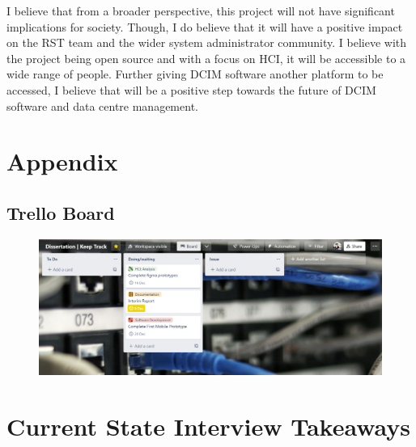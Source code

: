 \documentclass [11pt,a4paper]{article}
\begin{document}
I believe that from a broader perspective, this project will not have significant implications for society. Though, I do believe that it will have a positive impact on the RST team and the wider system administrator community. I believe with the project being open source and with a focus on HCI, it will be accessible to a wide range of people. Further giving DCIM software another platform to be accessed, I believe that will be a positive step towards the future of DCIM software and data centre management.
\pagebreak


 


\pagebreak
{}
\appendix
\section{Appendix}
\label{sec:appendix}
\subsection{Trello Board}
\label{sec:trello_board}
\begin{figure}[H]
    \centering
    \includegraphics[width=1\textwidth]{images/trello-board.png}
\end{figure}   

\section{Current State Interview Takeaways}
\label{sec:current_state_interview_takeaways}


\end{document}
